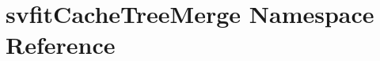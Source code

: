 \hypertarget{namespacesvfitCacheTreeMerge}{
\section{svfitCacheTreeMerge Namespace Reference}
\label{namespacesvfitCacheTreeMerge}
}
